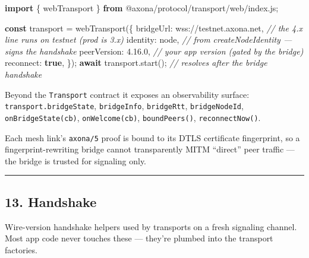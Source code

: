 \documentclass[
  nobib]{tufte-handout}
\newenvironment{Shaded}{}{}
\newcommand{\CommentTok}[1]{\textcolor[rgb]{0.38,0.63,0.69}{\textit{#1}}}
\newcommand{\ControlFlowTok}[1]{\textcolor[rgb]{0.00,0.44,0.13}{\textbf{#1}}}
\newcommand{\DataTypeTok}[1]{\textcolor[rgb]{0.56,0.13,0.00}{#1}}
\newcommand{\FunctionTok}[1]{\textcolor[rgb]{0.02,0.16,0.49}{#1}}
\newcommand{\ImportTok}[1]{\textcolor[rgb]{0.00,0.50,0.00}{\textbf{#1}}}
\newcommand{\KeywordTok}[1]{\textcolor[rgb]{0.00,0.44,0.13}{\textbf{#1}}}
\newcommand{\NormalTok}[1]{#1}
\newcommand{\OperatorTok}[1]{\textcolor[rgb]{0.40,0.40,0.40}{#1}}
\newcommand{\StringTok}[1]{\textcolor[rgb]{0.25,0.44,0.63}{#1}}
\begin{document}
\begin{Shaded}
\begin{Highlighting}[]
\ImportTok{import}\NormalTok{ \{ webTransport \} }\ImportTok{from} \StringTok{\textquotesingle{}@axona/protocol/transport/web/index.js\textquotesingle{}}\OperatorTok{;}

\KeywordTok{const}\NormalTok{ transport }\OperatorTok{=} \FunctionTok{webTransport}\NormalTok{(\{}
  \DataTypeTok{bridgeUrl}\OperatorTok{:}   \StringTok{\textquotesingle{}wss://testnet.axona.net\textquotesingle{}}\OperatorTok{,}  \CommentTok{// the 4.x line runs on testnet (prod is 3.x)}
  \DataTypeTok{identity}\OperatorTok{:}\NormalTok{    node}\OperatorTok{,}                       \CommentTok{// from createNodeIdentity — signs the handshake}
  \DataTypeTok{peerVersion}\OperatorTok{:} \StringTok{\textquotesingle{}4.16.0\textquotesingle{}}\OperatorTok{,}                   \CommentTok{// your app version (gated by the bridge)}
  \DataTypeTok{reconnect}\OperatorTok{:}   \KeywordTok{true}\OperatorTok{,}
\NormalTok{\})}\OperatorTok{;}
\ControlFlowTok{await}\NormalTok{ transport}\OperatorTok{.}\FunctionTok{start}\NormalTok{()}\OperatorTok{;}                  \CommentTok{// resolves after the bridge handshake}
\end{Highlighting}
\end{Shaded}

Beyond the \texttt{Transport} contract it exposes an observability
surface: \texttt{transport.bridgeState}, \texttt{bridgeInfo},
\texttt{bridgeRtt}, \texttt{bridgeNodeId}, \texttt{onBridgeState(cb)},
\texttt{onWelcome(cb)}, \texttt{boundPeers()}, \texttt{reconnectNow()}.

Each mesh link's \texttt{axona/5} proof is bound to its DTLS certificate
fingerprint, so a fingerprint-rewriting bridge cannot transparently MITM
``direct'' peer traffic --- the bridge is trusted for signaling only.

\begin{center}\rule{0.5\linewidth}{0.5pt}\end{center}

\subsection{13. Handshake}\label{handshake}

Wire-version handshake helpers used by transports on a fresh signaling
channel. Most app code never touches these --- they're plumbed into the
transport factories.
\end{document}
